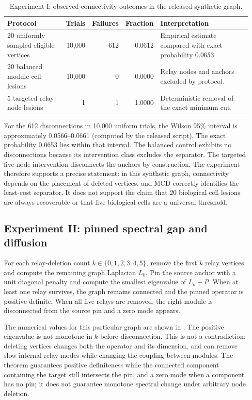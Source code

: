 \documentclass[12pt,a4paper]{article}
\begin{document}
\begin{table}[H]
\centering\small
\caption{Experiment I: observed connectivity outcomes in the released synthetic graph.}
\begin{tabularx}{\textwidth}{p{}r r r X}
\toprule
Protocol & Trials & Failures & Fraction & Interpretation\\
\midrule
20 uniformly sampled eligible vertices & 10,000 & 612 & 0.0612 & Empirical estimate compared with exact probability 0.0653.\\
20 balanced module-cell lesions & 10,000 & 0 & 0.0000 & Relay nodes and anchors excluded by protocol.\\
5 targeted relay-node lesions & 1 & 1 & 1.0000 & Deterministic removal of the exact minimum cut.\\
\bottomrule
\end{tabularx}
\end{table}

For the 612 disconnections in 10,000 uniform trials, the Wilson 95\% interval is approximately 0.0566--0.0661 (computed by the released script). The exact probability 0.0653 lies within that interval. The balanced control exhibits no disconnections because its intervention class excludes the separator. The targeted five-node intervention disconnects the anchors by construction. The experiment therefore supports a precise statement: in this synthetic graph, connectivity depends on the placement of deleted vertices, and MCD correctly identifies the least-cost separator. It does not support the claim that 20 biological cell lesions are always recoverable or that five biological cells are a universal threshold.

\subsection{Experiment II: pinned spectral gap and diffusion}
For each relay-deletion count \(k\in\{0,1,2,3,4,5\}\), remove the first \(k\) relay vertices and compute the remaining graph Laplacian \(L_k\). Pin the source anchor with a unit diagonal penalty and compute the smallest eigenvalue of \(L_k+P\). When at least one relay survives, the graph remains connected and the pinned operator is positive definite. When all five relays are removed, the right module is disconnected from the source pin and a zero mode appears.

The numerical values for this particular graph are shown in . The positive eigenvalue is not monotone in \(k\) before disconnection. This is not a contradiction: deleting vertices changes both the operator and its dimension, and can remove slow internal relay modes while changing the coupling between modules. The theorem guarantees positive definiteness while the connected component containing the target still intersects the pin, and a zero mode when a component has no pin; it does not guarantee monotone spectral change under arbitrary node deletion.
\end{document}
